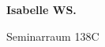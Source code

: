 \documentclass[a4paper]{article}
\begin{document}
\printGenericVSLHeader
\begin{center}
\begin{vsltext}{3cm}{4cm}

   \vspace{0.5cm} 

    \textbf{Isabelle WS.} 

    \vspace{1.5cm}

    Seminarraum 138C

\end{vsltext}

\end{center}
\end{document}
